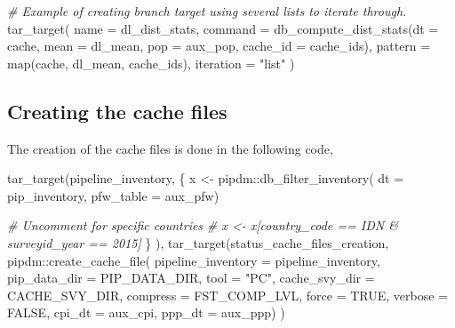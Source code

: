 \documentclass[
]{book}
\newenvironment{Shaded}{\begin{snugshade}}{\end{snugshade}}
\newcommand{\AttributeTok}[1]{\textcolor[rgb]{0.77,0.63,0.00}{#1}}
\newcommand{\CommentTok}[1]{\textcolor[rgb]{0.56,0.35,0.01}{\textit{#1}}}
\newcommand{\ConstantTok}[1]{\textcolor[rgb]{0.00,0.00,0.00}{#1}}
\newcommand{\FunctionTok}[1]{\textcolor[rgb]{0.00,0.00,0.00}{#1}}
\newcommand{\NormalTok}[1]{#1}
\newcommand{\OtherTok}[1]{\textcolor[rgb]{0.56,0.35,0.01}{#1}}
\newcommand{\SpecialCharTok}[1]{\textcolor[rgb]{0.00,0.00,0.00}{#1}}
\newcommand{\StringTok}[1]{\textcolor[rgb]{0.31,0.60,0.02}{#1}}
\begin{document}
\begin{Shaded}
\begin{Highlighting}[]

\CommentTok{\# Example of creating branch target using several lists to iterate through.}
\FunctionTok{tar\_target}\NormalTok{(}
  \AttributeTok{name      =}\NormalTok{ dl\_dist\_stats,}
  \AttributeTok{command   =} \FunctionTok{db\_compute\_dist\_stats}\NormalTok{(}\AttributeTok{dt       =}\NormalTok{ cache, }
                                    \AttributeTok{mean     =}\NormalTok{ dl\_mean, }
                                    \AttributeTok{pop      =}\NormalTok{ aux\_pop, }
                                    \AttributeTok{cache\_id =}\NormalTok{ cache\_ids), }
  \AttributeTok{pattern   =}  \FunctionTok{map}\NormalTok{(cache, dl\_mean, cache\_ids), }
  \AttributeTok{iteration =} \StringTok{"list"}
\NormalTok{)}
\end{Highlighting}
\end{Shaded}

\hypertarget{creating-the-cache-files}{%
\subsection*{Creating the cache files}\label{creating-the-cache-files}}

The creation of the cache files is done in the following code,

\begin{Shaded}
\begin{Highlighting}[]
\FunctionTok{tar\_target}\NormalTok{(pipeline\_inventory, \{}
\NormalTok{  x }\OtherTok{\textless{}{-}}\NormalTok{ pipdm}\SpecialCharTok{::}\FunctionTok{db\_filter\_inventory}\NormalTok{(}
    \AttributeTok{dt =}\NormalTok{ pip\_inventory,}
    \AttributeTok{pfw\_table =}\NormalTok{ aux\_pfw)}
  
  \CommentTok{\# Uncomment for specific countries}
  \CommentTok{\# x \textless{}{-} x[country\_code == \textquotesingle{}IDN\textquotesingle{} \& surveyid\_year == 2015]}
\NormalTok{\}}
\NormalTok{),}
\FunctionTok{tar\_target}\NormalTok{(status\_cache\_files\_creation, }
\NormalTok{           pipdm}\SpecialCharTok{::}\FunctionTok{create\_cache\_file}\NormalTok{(}
             \AttributeTok{pipeline\_inventory =}\NormalTok{ pipeline\_inventory,}
             \AttributeTok{pip\_data\_dir       =}\NormalTok{ PIP\_DATA\_DIR,}
             \AttributeTok{tool               =} \StringTok{"PC"}\NormalTok{,}
             \AttributeTok{cache\_svy\_dir      =}\NormalTok{ CACHE\_SVY\_DIR,}
             \AttributeTok{compress           =}\NormalTok{ FST\_COMP\_LVL,}
             \AttributeTok{force              =} \ConstantTok{TRUE}\NormalTok{,}
             \AttributeTok{verbose            =} \ConstantTok{FALSE}\NormalTok{,}
             \AttributeTok{cpi\_dt             =}\NormalTok{ aux\_cpi,}
             \AttributeTok{ppp\_dt             =}\NormalTok{ aux\_ppp)}
\NormalTok{)}
\end{Highlighting}
\end{Shaded}
\end{document}
